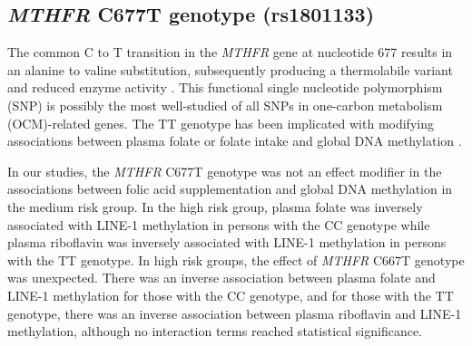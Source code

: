 \subsection{\emph{MTHFR} C677T genotype (rs1801133)} %
\noindent The common C to T transition in the \emph{MTHFR} gene at nucleotide 677 results in an alanine to valine substitution, subsequently producing a thermolabile variant and reduced enzyme activity \cite{c76}. This functional single nucleotide polymorphism (SNP) is possibly the most well-studied of all SNPs in one-carbon metabolism (OCM)-related genes. The TT genotype has been implicated with modifying associations between plasma folate or folate intake and global DNA methylation \cite{c75,c76,c712,c764,c765}. 
 
\noindent In our studies, the \emph{MTHFR} C677T genotype was not an effect modifier in the associations between folic acid supplementation and global DNA methylation in the medium risk group. In the high risk group, plasma folate was inversely associated with LINE-1 methylation in persons with the CC genotype while plasma riboflavin was inversely associated with LINE-1 methylation in persons with the TT genotype. In high risk groups, the effect of \emph{MTHFR} C667T genotype was unexpected. There was an inverse association between plasma folate and LINE-1 methylation for those with the CC genotype, and for those with the TT genotype, there was an inverse association between plasma riboflavin and LINE-1 methylation, although no interaction terms reached statistical significance. 
 
